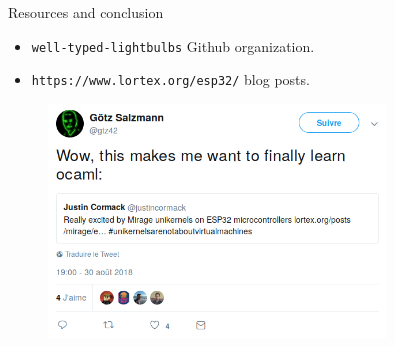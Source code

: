 \documentclass[10pt]{beamer}
\begin{document}
\begin{frame}{Resources and conclusion}
\begin{itemize}
\item \texttt{well-typed-lightbulbs} Github organization.
\item \texttt{https://www.lortex.org/esp32/} blog posts.
\end{itemize}
\pause
\begin{figure}
\centering
\includegraphics[width=0.8\textwidth]{twit.png}
\end{figure}
\end{frame}
\end{document}
